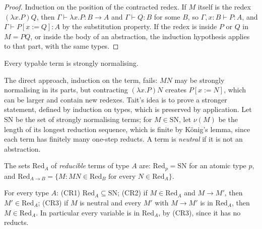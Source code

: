 \begin{proof}
Induction on the position of the contracted redex. If $M$ itself is the redex $(\lambda x.P)Q$, then $\Gamma\vdash\lambda x.P:B\to A$ and $\Gamma\vdash Q:B$ for some $B$, so $\Gamma,x:B\vdash P:A$, and $\Gamma\vdash P[x:=Q]:A$ by the substitution property. If the redex is inside $P$ or $Q$ in $M=PQ$, or inside the body of an abstraction, the induction hypothesis applies to that part, with the same types.
\end{proof}

\begin{theorem}[Tait, 1967]\label{thm:sn}
Every typable term is strongly normalising.
\end{theorem}

The direct approach, induction on the term, fails: $MN$ may be strongly normalising in its parts, but contracting $(\lambda x.P)N$ creates $P[x:=N]$, which can be larger and contain new redexes. Tait's idea is to prove a stronger statement, defined by induction on types, which is preserved by application. Let $\mathrm{SN}$ be the set of strongly normalising terms; for $M\in\mathrm{SN}$, let $\nu(M)$ be the length of its longest reduction sequence, which is finite by König's lemma, since each term has finitely many one-step reducts. A term is \emph{neutral} if it is not an abstraction.

\begin{definition}\label{def:reducible}
The sets $\mathrm{Red}_A$ of \emph{reducible} terms of type $A$ are: $\mathrm{Red}_p=\mathrm{SN}$ for an atomic type $p$, and $\mathrm{Red}_{A\to B}=\{M:MN\in\mathrm{Red}_B\text{ for every }N\in\mathrm{Red}_A\}$.
\end{definition}

\begin{lemma}\label{lem:cr123}
For every type $A$:
\textup{(CR1)} $\mathrm{Red}_A\subseteq\mathrm{SN}$;
\textup{(CR2)} if $M\in\mathrm{Red}_A$ and $M\to M'$, then $M'\in\mathrm{Red}_A$;
\textup{(CR3)} if $M$ is neutral and every $M'$ with $M\to M'$ is in $\mathrm{Red}_A$, then $M\in\mathrm{Red}_A$.
In particular every variable is in $\mathrm{Red}_A$, by \textup{(CR3)}, since it has no reducts.
\end{lemma}

